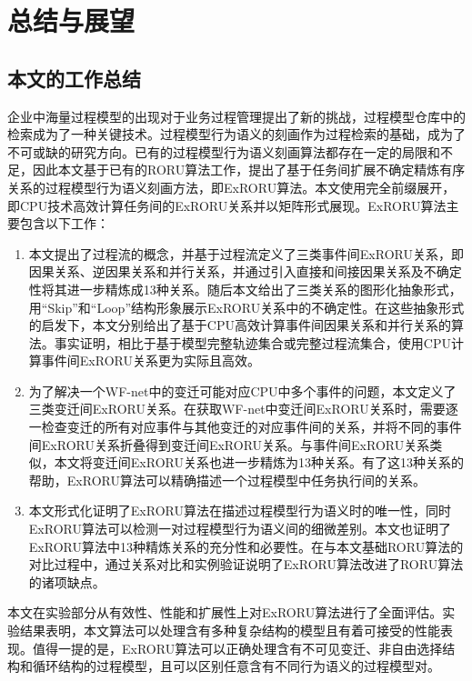 
\chapter{总结与展望}\label{cha:conclusion}

\section{本文的工作总结}\label{sec:conclusion}
企业中海量过程模型的出现对于业务过程管理提出了新的挑战，过程模型仓库中的检索成为了一种关键技术。过程模型行为语义的刻画作为过程检索的基础，成为了不可或缺的研究方向。已有的过程模型行为语义刻画算法都存在一定的局限和不足，因此本文基于已有的RORU算法工作，提出了基于任务间扩展不确定精炼有序关系的过程模型行为语义刻画方法，即ExRORU算法。本文使用完全前缀展开，即CPU技术高效计算任务间的ExRORU关系并以矩阵形式展现。ExRORU算法主要包含以下工作：
\begin{enumerate}[1.]
  \item 本文提出了过程流的概念，并基于过程流定义了三类事件间ExRORU关系，即因果关系、逆因果关系和并行关系，并通过引入直接和间接因果关系及不确定性将其进一步精炼成13种关系。随后本文给出了三类关系的图形化抽象形式，用“Skip”和“Loop”结构形象展示ExRORU关系中的不确定性。在这些抽象形式的启发下，本文分别给出了基于CPU高效计算事件间因果关系和并行关系的算法。事实证明，相比于基于模型完整轨迹集合或完整过程流集合，使用CPU计算事件间ExRORU关系更为实际且高效。
  \item 为了解决一个WF-net中的变迁可能对应CPU中多个事件的问题，本文定义了三类变迁间ExRORU关系。在获取WF-net中变迁间ExRORU关系时，需要逐一检查变迁的所有对应事件与其他变迁的对应事件间的关系，并将不同的事件间ExRORU关系折叠得到变迁间ExRORU关系。与事件间ExRORU关系类似，本文将变迁间ExRORU关系也进一步精炼为13种关系。有了这13种关系的帮助，ExRORU算法可以精确描述一个过程模型中任务执行间的关系。
  \item 本文形式化证明了ExRORU算法在描述过程模型行为语义时的唯一性，同时ExRORU算法可以检测一对过程模型行为语义间的细微差别。本文也证明了ExRORU算法中13种精炼关系的充分性和必要性。在与本文基础RORU算法的对比过程中，通过关系对比和实例验证说明了ExRORU算法改进了RORU算法的诸项缺点。
\end{enumerate}

本文在实验部分从有效性、性能和扩展性上对ExRORU算法进行了全面评估。实验结果表明，本文算法可以处理含有多种复杂结构的模型且有着可接受的性能表现。值得一提的是，ExRORU算法可以正确处理含有不可见变迁、非自由选择结构和循环结构的过程模型，且可以区别任意含有不同行为语义的过程模型对。

